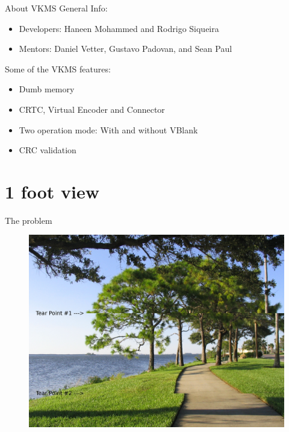 \documentclass[10pt, compress, aspectratio=169]{beamer}
\begin{document}
\begin{frame}{About VKMS}
  General Info:
  \begin{itemize}
    \item Developers: Haneen Mohammed and Rodrigo Siqueira
    \item Mentors: Daniel Vetter, Gustavo Padovan, and Sean Paul
  \end{itemize}
  Some of the VKMS features:
  \begin{itemize}
    \item Dumb memory
    \item CRTC, Virtual Encoder and Connector
    \item Two operation mode: With and without VBlank
    \item CRC validation
  \end{itemize}
\end{frame}

\section{1 foot view}

\begin{frame}{The problem}
  \begin{figure}
    \centering
    \includegraphics[width=\linewidth,
                     height=0.9\textheight,
                     keepaspectratio]{tearing}
  \end{figure}
\end{frame}
\end{document}

